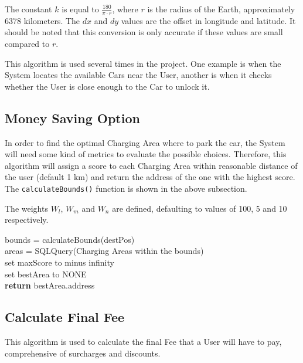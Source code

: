 \documentclass[12pt]{article}
\begin{document}
The constant $k$ is equal to $\frac{180}{\pi\cdot r}$, where $r$ is the radius of the Earth, approximately 6378 kilometers. The $dx$ and $dy$ values are the offset in longitude and latitude. It should be noted that this conversion is only accurate if these values are small compared to $r$.

This algorithm is used several times in the project. One example is when the System locates the available Cars near the User, another is when it checks whether the User is close enough to the Car to unlock it.

\subsection{Money Saving Option}
In order to find the optimal Charging Area where to park the car, the System will need some kind of metrics to evaluate the possible choices. Therefore, this algorithm will assign a score to each Charging Area within reasonable distance of the user (default 1 km) and return the address of the one with the highest score. The \verb+calculateBounds()+ function is shown in the above subsection.

The weights $W_l$, $W_m$ and $W_n$ are defined, defaulting to values of 100, 5 and 10 respectively.

\begin{algorithm}[H]
 bounds = calculateBounds(destPos)\\ 
 areas = SQLQuery(Charging Areas within the bounds)\\ 
 set maxScore to minus infinity\\ 
 set bestArea to NONE\\ 
 \textbf{return} bestArea.address

\end{algorithm}
\subsection{Calculate Final Fee}
This algorithm is used to calculate the final Fee that a User will have to pay, comprehensive of surcharges and discounts.
\end{document}
